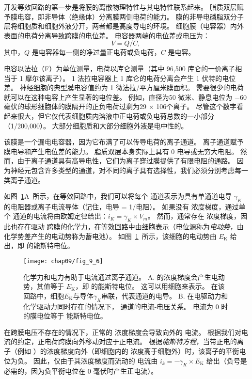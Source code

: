 开发等效回路的第一步是将膜的离散物理特性与其电特性联系起来。
脂质双层赋予膜电容，即非导体（绝缘体）分离膜两侧电荷的能力。
膜的非导电磷脂双分子层将细胞质和细胞外液分开，两者都是高度导电的环境。
细胞膜（电容器）内外表面的电荷分离导致跨膜的电位差。
电容器两端的电位差或电压为：
\begin{equation}
	V = Q/C,
\end{equation}
其中，$Q$ 是电容器每一侧的净过量正电荷或负电荷，$C$ 是电容。


电容以法拉（F）为单位测量，电荷以库仑测量（其中 96,500 库仑的一价离子相当于 1 摩尔该离子）。
1 法拉电容器上 1 库仑的电荷分离会产生 1 伏特的电位差。
神经细胞的典型膜电容值约为 1 微法拉/平方厘米膜面积。
需要很少的电荷就可以在这种电容上产生显著的电位差。 
例如，直径为50 微米、静息电位为 −60 毫伏的球形细胞体的膜隔开的正负电荷过剩为29 $\times$ 106个离子。
尽管这个数字看起来很大，但它仅代表细胞质内溶液中正电荷或负电荷总数的一小部分（1/200,000）。
大部分细胞质和大部分细胞外液是电中性的。


该膜是一个漏电电容器，因为它布满了可以传导电荷的离子通道。
离子通道赋予膜电导和产生电位差的能力。
脂质双层本身实际上具有 0 电导或无穷大电阻。
然而，由于离子通道具有高导电性，它们为离子穿过膜提供了有限电阻的通路。
因为神经元包含许多类型的通道，对不同的离子具有选择性，我们必须分别考虑每一类离子通道。


如图~\ref{fig:9_6}A~所示，在等效回路中，我们可以将每个  通道表示为具有单通道电导 $\gamma_K$ 的电阻器或离子电流导体（记住，电导 = 1/电阻）。 
如果没有  浓度梯度，通过单个  通道的电流将由欧姆定律给出：$i_K = \gamma_K \times V_m$。
然而，通常存在  浓度梯度，因此也存在驱动  跨膜的化学力，在等效回路中由细胞表示（电位源称为\textit{电动势}，由化学势差产生的电动势称为蓄电池）。
如图~\ref{fig:9_6}~所示，该细胞的电动势由 $E_\text{K}$ 给出，即  的能斯特电位。


\begin{figure}[htbp]
	\centering
	\texttt{[image: chap09/fig\_9\_6]}
	\caption{化学力和电力有助于电流通过离子通道。
		A.  的浓度梯度会产生电动势，其值等于 $E_\text{K}$，即  的能斯特电位。
		这可以用细胞来表示。
		在该回路中，细胞$E_\text{K}$与导体$\gamma_K$串联，代表通道的电导。
		B. 在电驱动力和化学驱动力同时存在的情况下， 通道的电流-电压关系。
		电流为 0 时的膜电位等于  能斯特电位。}
	\label{fig:9_6}
\end{figure}


在跨膜电压不存在的情况下，正常的  浓度梯度会导致向外的  电流。
根据我们对电流的约定，正电荷跨膜向外移动对应于正电流。
根据\textit{能斯特方程}，当带正电的离子（例如 ）的浓度梯度向外（即细胞内的  浓度高于细胞外）时，该离子的平衡电位为负。
因此，仅由于其浓度梯度而流动的  电流由 $i_k = -\gamma_K \times E_\text{K}$ 给出（负号是必需的，因为负平衡电位在 0 毫伏时产生正电流）。


